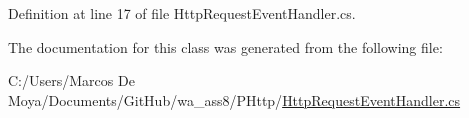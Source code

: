 Definition at line 17 of file Http\+Request\+Event\+Handler.\+cs.



The documentation for this class was generated from the following file\+:\begin{DoxyCompactItemize}
\item 
C\+:/\+Users/\+Marcos De Moya/\+Documents/\+Git\+Hub/wa\+\_\+ass8/\+P\+Http/\hyperlink{_http_request_event_handler_8cs}{Http\+Request\+Event\+Handler.\+cs}\end{DoxyCompactItemize}
